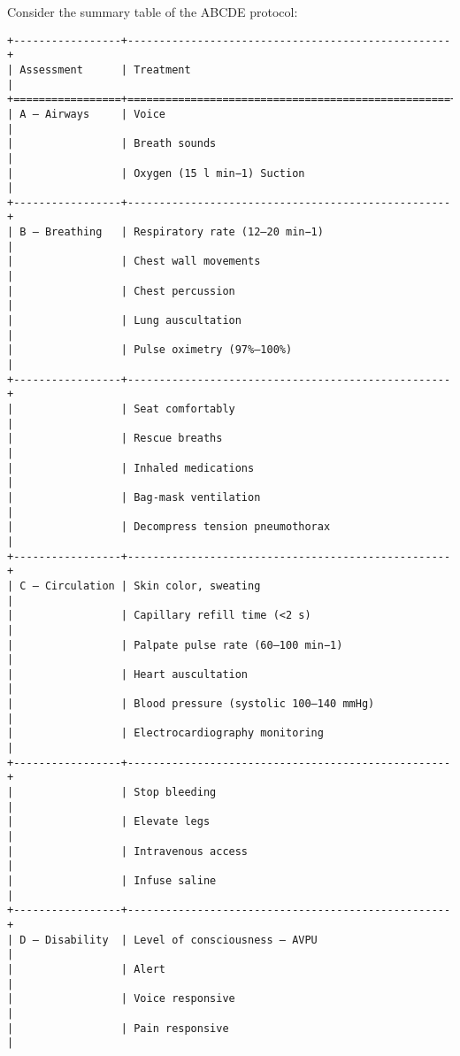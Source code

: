 Consider the summary table of the ABCDE protocol:

\begin{lstlisting}
+-----------------+---------------------------------------------------+
| Assessment      | Treatment                                         |
+=================+===================================================+
| A – Airways     | Voice                                             |
|                 | Breath sounds                                     |
|                 | Oxygen (15 l min−1) Suction                       |
+-----------------+---------------------------------------------------+
| B – Breathing   | Respiratory rate (12–20 min−1)                    |
|                 | Chest wall movements                              |
|                 | Chest percussion                                  |
|                 | Lung auscultation                                 |
|                 | Pulse oximetry (97%–100%)                         |
+-----------------+---------------------------------------------------+
|                 | Seat comfortably                                  |
|                 | Rescue breaths                                    |
|                 | Inhaled medications                               |
|                 | Bag-mask ventilation                              |
|                 | Decompress tension pneumothorax                   |
+-----------------+---------------------------------------------------+
| C – Circulation | Skin color, sweating                              |
|                 | Capillary refill time (<2 s)                      |
|                 | Palpate pulse rate (60–100 min−1)                 |
|                 | Heart auscultation                                |
|                 | Blood pressure (systolic 100–140 mmHg)            |
|                 | Electrocardiography monitoring                    |
+-----------------+---------------------------------------------------+
|                 | Stop bleeding                                     |
|                 | Elevate legs                                      |
|                 | Intravenous access                                |
|                 | Infuse saline                                     |
+-----------------+---------------------------------------------------+
| D – Disability  | Level of consciousness – AVPU                     |
|                 | Alert                                             |
|                 | Voice responsive                                  |
|                 | Pain responsive                                   |

\end{lstlisting}
